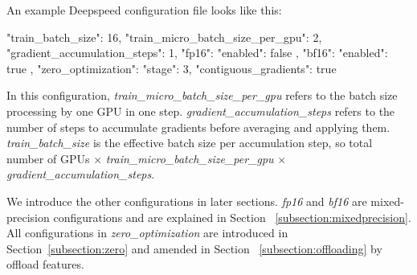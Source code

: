 An example Deepspeed configuration file looks like this:

\begin{json}
{
    "train_batch_size": 16,
    "train_micro_batch_size_per_gpu": 2,
    "gradient_accumulation_steps": 1,
    "fp16": {
        "enabled": false
    },
    "bf16": {
        "enabled": true
    },
    "zero_optimization": {
        "stage": 3,
        "contiguous_gradients": true
    }
}
\end{json}

In this configuration, \textit{train\_micro\_batch\_size\_per\_gpu} refers to the 
batch size processing by one GPU in one step. \textit{gradient\_accumulation\_steps} 
refers to the number of steps to accumulate gradients before averaging and applying 
them. \textit{train\_batch\_size} is the effective batch size per accumulation step, 
so total number of GPUs $\times$ \textit{train\_micro\_batch\_size\_per\_gpu} $\times$ 
\textit{gradient\_accumulation\_steps}. 

We introduce the other configurations in later sections. \textit{fp16} and 
\textit{bf16} are mixed-precision configurations and are explained in Section~
\ref{subsection:mixedprecision}. All configurations in \textit{zero\_optimization} 
are introduced in Section~\ref{subsection:zero} and amended in Section~
\ref{subsection:offloading} by offload features.